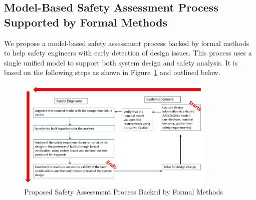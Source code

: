 \subsection{Model-Based Safety Assessment Process Supported by Formal Methods}
\label{subsec:process}
We propose a model-based safety assessment process backed by formal methods to help safety engineers with early detection of design issues.  This process uses a single unified model to support both system design and safety analysis. It is based on the following steps as shown in Figure~\ref{fig:updated_safety_process} and outlined below.

\begin{figure}[t!]
	
	\centering
	\includegraphics[width=0.85\textwidth]{images/process4.jpg}
	
	\caption{Proposed Safety Assessment Process Backed by Formal Methods}
	\label{fig:updated_safety_process}
\end{figure}

